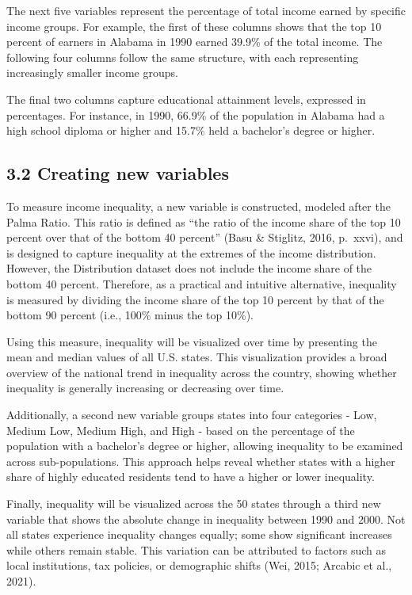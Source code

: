 \documentclass[
]{article}
\begin{document}
The next five variables represent the percentage of total income earned
by specific income groups. For example, the first of these columns shows
that the top 10 percent of earners in Alabama in 1990 earned 39.9\% of
the total income. The following four columns follow the same structure,
with each representing increasingly smaller income groups.

The final two columns capture educational attainment levels, expressed
in percentages. For instance, in 1990, 66.9\% of the population in
Alabama had a high school diploma or higher and 15.7\% held a bachelor's
degree or higher.

\subsection{3.2 Creating new variables}\label{creating-new-variables}

To measure income inequality, a new variable is constructed, modeled
after the Palma Ratio. This ratio is defined as ``the ratio of the
income share of the top 10 percent over that of the bottom 40 percent''
(Basu \& Stiglitz, 2016, p.~xxvi), and is designed to capture inequality
at the extremes of the income distribution. However, the Distribution
dataset does not include the income share of the bottom 40 percent.
Therefore, as a practical and intuitive alternative, inequality is
measured by dividing the income share of the top 10 percent by that of
the bottom 90 percent (i.e., 100\% minus the top 10\%).

Using this measure, inequality will be visualized over time by
presenting the mean and median values of all U.S. states. This
visualization provides a broad overview of the national trend in
inequality across the country, showing whether inequality is generally
increasing or decreasing over time.

Additionally, a second new variable groups states into four categories -
Low, Medium Low, Medium High, and High - based on the percentage of the
population with a bachelor's degree or higher, allowing inequality to be
examined across sub-populations. This approach helps reveal whether
states with a higher share of highly educated residents tend to have a
higher or lower inequality.

Finally, inequality will be visualized across the 50 states through a
third new variable that shows the absolute change in inequality between
1990 and 2000. Not all states experience inequality changes equally;
some show significant increases while others remain stable. This
variation can be attributed to factors such as local institutions, tax
policies, or demographic shifts (Wei, 2015; Arcabic et al., 2021).
\end{document}
